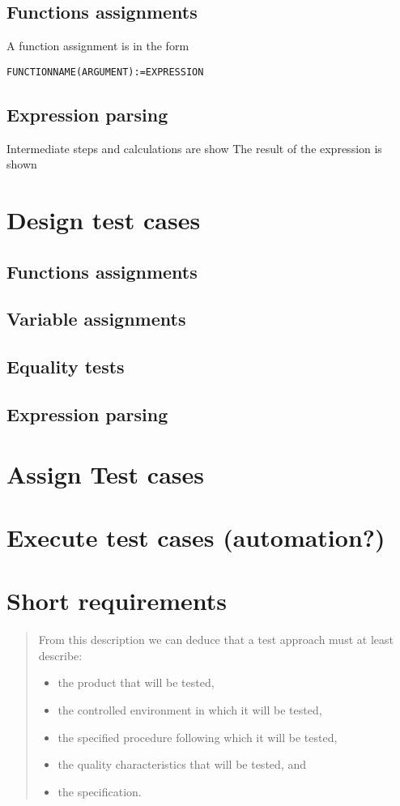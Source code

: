 \documentclass[11pt,a4paper]{article}
\begin{document}
\subsection{Functions assignments}
A function assignment is in the form

\texttt{FUNCTIONNAME(ARGUMENT):=EXPRESSION}
\subsection{Expression parsing}
Intermediate steps and calculations are show
The result of the expression is shown
\section{Design test cases}
\subsection{Functions assignments}
\subsection{Variable assignments}
\subsection{Equality tests}
\subsection{Expression parsing}
\section{Assign Test cases}
\section{Execute test cases (automation?)}
\section{Short requirements}
\begin{quote}
From this description we can deduce that a test approach must at least describe:
\begin{itemize}
\item the product that will be tested,
\item the controlled environment in which it will be tested,
\item the specified procedure following which it will be tested,
\item the quality characteristics that will be tested, and
\item the specification.
\end{itemize}
\end{quote}
\end{document}
